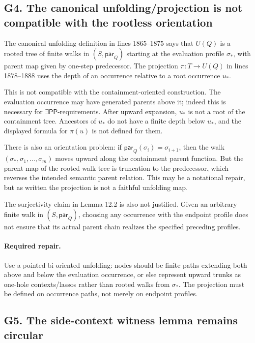 \documentclass[11pt]{article}
\newcommand{\PP}{\mathsf{PP}}
\newcommand{\parQ}{\mathsf{par}_Q}
\begin{document}
\subsection{G4. The canonical unfolding/projection is not compatible with the rootless orientation}

The canonical unfolding definition in lines 1865--1875 says that \(U(Q)\) is a
rooted tree of finite walks in \((S,\parQ)\) starting at the evaluation profile
\(\sigma_\ast\), with parent map given by one-step predecessor.  The projection
\(\pi:T\to U(Q)\) in lines 1878--1888 uses the depth of an occurrence relative
to a root occurrence \(u_\ast\).

This is not compatible with the containment-oriented construction.  The
evaluation occurrence may have generated parents above it; indeed this is
necessary for \(\exists\PP\)-requirements.  After upward expansion, \(u_\ast\)
is not a root of the containment tree.  Ancestors of \(u_\ast\) do not have a
finite depth below \(u_\ast\), and the displayed formula for \(\pi(u)\) is not
defined for them.

There is also an orientation problem: if \(\parQ(\sigma_i)=\sigma_{i+1}\), then
the walk \((\sigma_\ast,\sigma_1,\ldots,\sigma_m)\) moves upward along the
containment parent function.  But the parent map of the rooted walk tree is
truncation to the predecessor, which reverses the intended semantic parent
relation.  This may be a notational repair, but as written the projection is
not a faithful unfolding map.

The surjectivity claim in Lemma 12.2 is also not justified.  Given an arbitrary
finite walk in \((S,\parQ)\), choosing any occurrence with the endpoint profile
does not ensure that its actual parent chain realizes the specified preceding
profiles.

\paragraph{Required repair.}
Use a pointed bi-oriented unfolding: nodes should be finite paths extending both
above and below the evaluation occurrence, or else represent upward trunks as
one-hole contexts/lassos rather than rooted walks from \(\sigma_\ast\).  The
projection must be defined on occurrence paths, not merely on endpoint profiles.

\subsection{G5. The side-context witness lemma remains circular}
\end{document}
